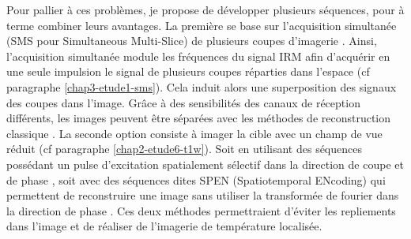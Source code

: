 
Pour pallier à ces problèmes, je propose de développer plusieurs séquences, pour à terme combiner leurs avantages. La première se base sur l’acquisition simultanée (SMS pour Simultaneous Multi-Slice) de plusieurs coupes d’imagerie \cite{larkman2001investigation,setsompop2012blipped}. Ainsi, l’acquisition simultanée module les fréquences du signal IRM afin d’acquérir en une seule impulsion le signal de plusieurs coupes réparties dans l’espace (cf paragraphe \ref{chap3-etude1-sms}). Cela induit alors une superposition des signaux des coupes dans l’image. Grâce à des sensibilités des canaux de réception différents, les images peuvent être séparées avec les méthodes de reconstruction classique \cite{breuer2005controlled}. La seconde option consiste à imager la cible avec un champ de vue réduit (cf paragraphe \ref{chap2-etude6-t1w}). Soit en utilisant des séquences possédant un pulse d’excitation spatialement sélectif dans la direction de coupe et de phase \cite{saritas2008dwi}, soit avec des séquences dites SPEN (Spatiotemporal ENcoding) qui permettent de reconstruire une image sans utiliser la transformée de fourier dans la direction de phase \cite{ben2010super}. Ces deux méthodes permettraient d’éviter les repliements dans l’image et de réaliser de l’imagerie de température localisée.\\
